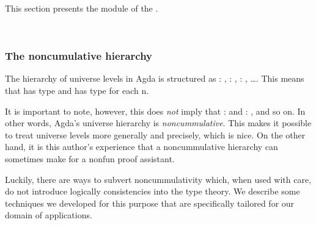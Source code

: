 This section presents the \ualibLifts module of the \agdaualib.
\ccpad
\begin{code}%
\>[0]\AgdaSpace{}%
\AgdaSpace{}%
\<%
%
\\[\AgdaEmptyExtraSkip]%
\>[0]\AgdaSpace{}%
\AgdaSpace{}%
\AgdaSpace{}%
\<%
\end{code}

\subsubsection{The noncumulative hierarchy}\label{the-noncumulative-hierarchy}
The hierarchy of universe levels in Agda is structured as  \as : , \hskip3mm  \as : , \hskip3mm  \as : , \ldots{}. This means that  has type   and  has type   for each \ab n.

It is important to note, however, this does \emph{not} imply that  \as :  and  \as : , and so on. In other words, Agda's universe hierarchy is \emph{noncummulative}. This makes it possible to treat universe levels more generally and precisely, which is nice. On the other hand, it is this author's experience that a noncummulative hierarchy can sometimes make for a nonfun proof assistant.

Luckily, there are ways to subvert noncummulativity which, when used with care, do not introduce logically consistencies into the type theory. We describe some techniques we developed for this purpose that are specifically tailored for our domain of applications.

